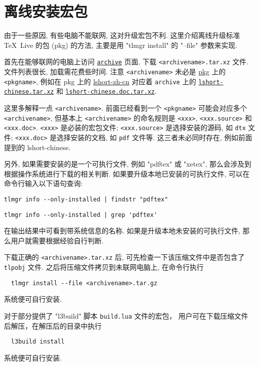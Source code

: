 
\chapter{离线安装宏包}

由于一些原因,
有些电脑不能联网,
这对升级宏包不利.
这里介绍离线升级标准 \TeX\ Live 的包 (pkg) 的方法,
主要是用 "tlmgr install" 的 "--file" 参数来实现.

首先在能够联网的电脑上访问
\href{https://ctan.org/tex-archive/systems/texlive/tlnet/archive}{\texttt{archive}}
页面, 下载 \texttt{<archivename>.tar.xz} 文件.
文件列表很长, 加载需花费些时间.
注意 \texttt{<archivename>} 未必是
\href{https://ctan.org/pkg/}{\textsf{pkg}} 上的 \texttt{<pkgname>},
例如在 \textsf{pkg} 上的
\href{https://ctan.org/pkg/lshort-zh-cn}{\textsf{lshort-zh-cn}}
对应着 \texttt{archive} 上的
\href{http://mirrors.ctan.org/systems/texlive/tlnet/archive/lshort-chinese.tar.xz}{\texttt{lshort-chinese.tar.xz}}
和
\href{http://mirrors.ctan.org/systems/texlive/tlnet/archive/lshort-chinese.doc.tar.xz}{\texttt{lshort-chinese.doc.tar.xz}}.

这里多解释一点 \texttt{<archivename>}.
前面已经看到一个 \texttt{<pkgname>} 可能会对应多个 \texttt{<archivename>},
但基本上 \texttt{<archivename>} 的命名规则是 \texttt{<xxx>},
\texttt{<xxx.source>} 和 \texttt{<xxx.doc>}.
\texttt{<xxx>} 是必装的宏包文件;
\texttt{<xxx.source>} 是选择安装的源码, 如 \texttt{dtx} 文件;
\texttt{<xxx.doc>} 是选择安装的文档, 如 \texttt{pdf} 文件等.
这三者未必同时存在, 例如前面提到的 \textsf{lshort-chinese}.

另外, 如果需要安装的是一个可执行文件, 例如 "pdftex" 或 "xetex",
那么会涉及到根据操作系统进行下载的相关判断.
如果要升级本地已安装的可执行文件, 可以在命令行输入以下语句查询:
\begin{lstlisting}[title = \small\sffamily Windows 系统]
  tlmgr info --only-installed | findstr "pdftex"
\end{lstlisting}
\begin{lstlisting}[title = \small\sffamily Ubuntu 和 macOS]
  tlmgr info --only-installed | grep 'pdftex'
\end{lstlisting}
在输出结果中可看到带系统信息的名称.
如果是升级本地未安装的可执行文件,
那么用户就需要根据经验自行判断.

下载正确的 \texttt{<archivename>.tar.xz} 后,
可先检查一下该压缩文件中是否包含了 \texttt{tlpobj} 文件.
之后将压缩文件拷贝到未联网电脑上,
在命令行执行
\begin{lstlisting} 
  tlmgr install --file <archivename>.tar.gz 
\end{lstlisting}
系统便可自行安装.

对于部分提供了 "l3build" 脚本 \texttt{build.lua} 文件的宏包，
用户可在下载压缩文件后解压，在解压后的目录中执行
\begin{lstlisting} 
  l3build install
\end{lstlisting}
系统便可自行安装.
